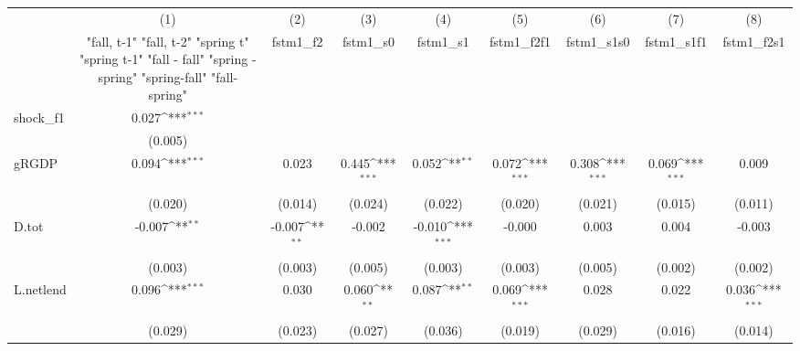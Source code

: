 {
\def\sym#1{\ifmmode^{#1}\else\(^{#1}\)\fi}
\begin{tabular}{l*{8}{c}}
\toprule
            &\multicolumn{1}{c}{(1)}&\multicolumn{1}{c}{(2)}&\multicolumn{1}{c}{(3)}&\multicolumn{1}{c}{(4)}&\multicolumn{1}{c}{(5)}&\multicolumn{1}{c}{(6)}&\multicolumn{1}{c}{(7)}&\multicolumn{1}{c}{(8)}\\
            &\multicolumn{1}{c}{  "fall, t-1" "fall, t-2" "spring t" "spring t-1"  "fall - fall" "spring - spring" "spring-fall" "fall-spring" }&\multicolumn{1}{c}{fstm1\_f2}&\multicolumn{1}{c}{fstm1\_s0}&\multicolumn{1}{c}{fstm1\_s1}&\multicolumn{1}{c}{fstm1\_f2f1}&\multicolumn{1}{c}{fstm1\_s1s0}&\multicolumn{1}{c}{fstm1\_s1f1}&\multicolumn{1}{c}{fstm1\_f2s1}\\
\midrule
shock\_f1    &       0.027\sym{***}&                     &                     &                     &                     &                     &                     &                     \\
            &     (0.005)         &                     &                     &                     &                     &                     &                     &                     \\
\addlinespace
gRGDP       &       0.094\sym{***}&       0.023         &       0.445\sym{***}&       0.052\sym{**} &       0.072\sym{***}&       0.308\sym{***}&       0.069\sym{***}&       0.009         \\
            &     (0.020)         &     (0.014)         &     (0.024)         &     (0.022)         &     (0.020)         &     (0.021)         &     (0.015)         &     (0.011)         \\
\addlinespace
D.tot       &      -0.007\sym{**} &      -0.007\sym{**} &      -0.002         &      -0.010\sym{***}&      -0.000         &       0.003         &       0.004         &      -0.003         \\
            &     (0.003)         &     (0.003)         &     (0.005)         &     (0.003)         &     (0.003)         &     (0.005)         &     (0.002)         &     (0.002)         \\
\addlinespace
L.netlend   &       0.096\sym{***}&       0.030         &       0.060\sym{**} &       0.087\sym{**} &       0.069\sym{***}&       0.028         &       0.022         &       0.036\sym{***}\\
            &     (0.029)         &     (0.023)         &     (0.027)         &     (0.036)         &     (0.019)         &     (0.029)         &     (0.016)         &     (0.014)         \\

\end{tabular}}
